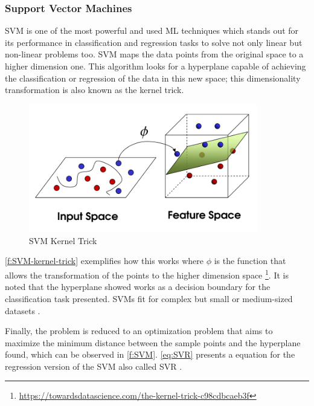 

\subsubsection{Support Vector Machines}

\ac{SVM} is one of the most powerful and used \ac{ML} techniques which stands out for its performance in classification and regression tasks to solve not only linear but non-linear problems too. \ac{SVM} maps the data points from the original space to a higher dimension one. This algorithm looks for a hyperplane capable of achieving the classification or regression of the data in this new space; this dimensionality transformation is also known as the kernel trick\cite{Batta2020}.

\begin{figure}[h]
\centering
\includegraphics[width=10cm]{figures/Ch2/SVM-KernelTrick.png}
\caption{SVM Kernel Trick}
\label{f:SVM-kernel-trick}
\end{figure}

\autoref{f:SVM-kernel-trick} exemplifies how this works where \begin{math}\phi\end{math} is the function that allows the transformation of the points to the higher dimension space \footnote{\url{https://towardsdatascience.com/the-kernel-trick-c98cdbcaeb3f}}. It is noted that the hyperplane showed works as a decision boundary for the classification task presented. \ac{SVM}s fit for complex but small or medium-sized datasets \cite{geron2017}.
 
Finally, the problem is reduced to an optimization problem that aims to maximize the minimum distance between the sample points and the hyperplane found, which can be observed in \autoref{f:SVM}. \autoref{eq:SVR} presents a equation for the regression version of the \ac{SVM} also called \ac{SVR} \cite{Ye2020}. 

